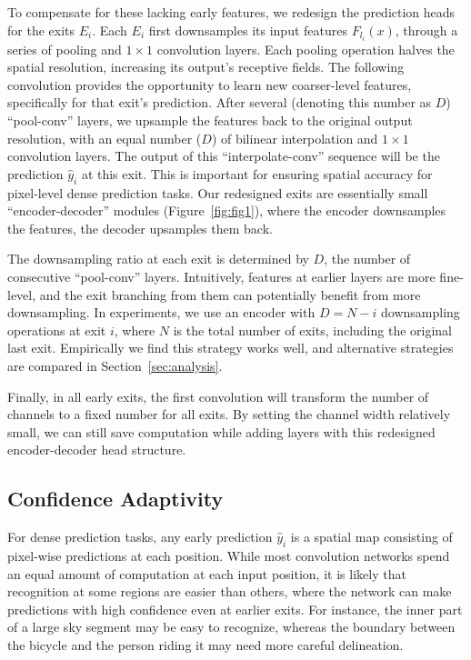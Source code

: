 To compensate for these lacking early features, we redesign the prediction heads for the exits $E_i$.
Each $E_i$ first downsamples its input features $F_{l_i}(x)$, through a series of pooling and $1\times1$ convolution layers.
Each pooling operation halves the spatial resolution, increasing its output's receptive fields.
The following convolution provides the opportunity to learn new coarser-level features, specifically for that exit's prediction.  
After several (denoting this number as $D$) ``pool-conv'' layers, we upsample the features back to the original output resolution, with an equal number ($D$) of bilinear interpolation and $1\times1$ convolution layers.
The output of this ``interpolate-conv'' sequence will be the prediction $\hat{y}_i$ at this exit.
This is important for ensuring spatial accuracy for pixel-level dense prediction tasks.
Our redesigned exits are essentially small ``encoder-decoder'' modules (Figure~\ref{fig:fig1}), where the encoder downsamples the features, the decoder upsamples them back.

The downsampling ratio at each exit is determined by $D$, the number of consecutive ``pool-conv'' layers.
Intuitively, features at earlier layers are more fine-level, and the exit branching from them can potentially benefit from more downsampling.
In experiments, we use an encoder with $D=N-i$ downsampling operations at exit $i$, where $N$ is the total number of exits, including the original last exit.
Empirically we find this strategy works well, and alternative strategies are compared in Section~\ref{sec:analysis}. 

Finally, in all early exits, the first convolution will transform the number of channels to a fixed number for all exits.
By setting the channel width relatively small, we can still save computation while adding layers with this redesigned encoder-decoder head structure.

\subsection{Confidence Adaptivity}
For dense prediction tasks, any early prediction $\hat{y}_i$ is a spatial map consisting of pixel-wise predictions at each position.
While most convolution networks spend an equal amount of computation at each input position, it is likely that recognition at some regions are easier than others, where the network can make predictions with high confidence even at earlier exits.
For instance, the inner part of a large sky segment may be easy to recognize, whereas the boundary between the bicycle and the person riding it may need more careful delineation.

